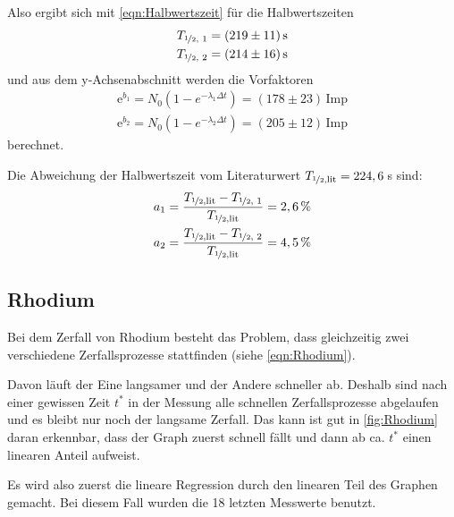         Also ergibt sich mit \autoref{eqn:Halbwertszeit} für die Halbwertszeiten
        \begin{align*}
            T_{\nicefrac{1}{2} \text{, 1}} = (219 \pm 11)\, \text{s} \\
            T_{\nicefrac{1}{2} \text{, 2}} = (214 \pm 16)\, \text{s}
        \end{align*}
        und aus dem y-Achsenabschnitt werden die Vorfaktoren
        \begin{align*}
            \text{e}^{b_1} = N_0 \left(1 - e^{-\lambda_1 \Delta t}\right) = (178 \pm 23) \,\text{Imp} \\
            \text{e}^{b_2} = N_0 \left(1 - e^{-\lambda_2 \Delta t}\right) = (205 \pm 12) \,\text{Imp}
        \end{align*}
        berechnet.

        Die Abweichung der Halbwertszeit vom Literaturwert $T_{\nicefrac{1}{2} \text{,lit}} = 224,6 \,$s sind:
        \begin{align*}
            a_1 = \frac{T_{\nicefrac{1}{2} \text{,lit}} - T_{\nicefrac{1}{2} \text{, 1}}}{T_{\nicefrac{1}{2} \text{,lit}}} = 2,6 \, \% \\
            a_2 = \frac{T_{\nicefrac{1}{2} \text{,lit}} - T_{\nicefrac{1}{2} \text{, 2}}}{T_{\nicefrac{1}{2} \text{,lit}}} = 4,5 \, \%
        \end{align*}

    \newpage
    \subsection{Rhodium}
        Bei dem Zerfall von Rhodium besteht das Problem, dass gleichzeitig zwei verschiedene Zerfallsprozesse stattfinden (siehe \autoref{eqn:Rhodium}).

        Davon läuft der Eine langsamer und der Andere schneller ab. Deshalb sind nach einer gewissen Zeit $t^*$ in der Messung alle schnellen Zerfallsprozesse abgelaufen und es bleibt nur noch der langsame Zerfall. Das kann ist gut in \autoref{fig:Rhodium} daran erkennbar, dass der Graph zuerst schnell fällt und dann ab ca. $t^*$ einen linearen Anteil aufweist.

        Es wird also zuerst die lineare Regression durch den linearen Teil des Graphen gemacht. Bei diesem Fall wurden die 18 letzten Messwerte benutzt.

